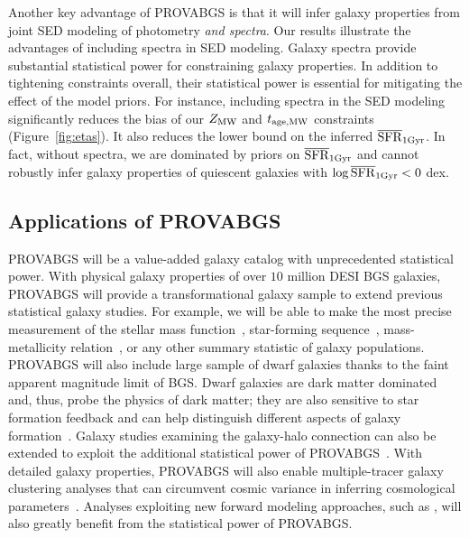 Another key advantage of {\sc PROVABGS} is that it will infer galaxy
properties from joint SED modeling of photometry \emph{and spectra}. 
Our results illustrate the advantages of including spectra in SED modeling. 
Galaxy spectra provide substantial statistical power for constraining 
galaxy properties. 
In addition to tightening constraints overall, their statistical power is
essential for mitigating the effect of the model priors. 
For instance, including spectra in the SED modeling significantly reduces the
bias of our $Z_{\rm MW}$ and $t_{\rm age, MW}$ constraints (Figure~\ref{fig:etas}). 
It also reduces the lower bound on the inferred $\overline{\rm SFR}_{\rm 1Gyr}$. 
In fact, without spectra, we are dominated by priors on $\overline{\rm SFR}_{\rm 1Gyr}$ and cannot
robustly infer galaxy properties of quiescent galaxies with $\log\overline{\rm SFR}_{\rm 1Gyr} < 0$
dex.

\subsection{Applications of PROVABGS}
{\sc PROVABGS} will be a value-added galaxy catalog with unprecedented
statistical power. 
With physical galaxy properties of over $10$ million DESI BGS galaxies, 
{\sc PROVABGS} will provide a transformational galaxy sample to extend
previous statistical galaxy studies. 
For example, we will be able to make the most precise measurement of the
stellar mass function~\citep[SMF]{li2009, moustakas2013}, star-forming
sequence~\citep{noeske2007, curtis-lake2021}, mass-metallicity
relation~\citep{tremonti2004}, or any other summary statistic of galaxy
populations. 
{\sc PROVABGS} will also include large sample of dwarf galaxies thanks to the
faint apparent magnitude limit of BGS. 
Dwarf galaxies are dark matter dominated and, thus, probe the physics of
dark matter; they are also sensitive to star formation feedback and can help
distinguish different aspects of galaxy formation~\citep{mao2021}. 
Galaxy studies examining the galaxy-halo connection can also be extended to
exploit the additional statistical power of {\sc
PROVABGS}~\citep[\emph{e.g.}][]{tinker2011, wetzel2013, zu2015, hahn2017,
hahn2019b}. 
With detailed galaxy properties, {\sc PROVABGS} will also enable
multiple-tracer galaxy clustering analyses that can circumvent cosmic variance
in inferring cosmological parameters~\citep{seljak2009, mcdonald2009,
wang2020}.
Analyses exploiting new forward modeling approaches, such as \cite{hahn2021},
will also greatly benefit from the statistical power of {\sc PROVABGS}.

